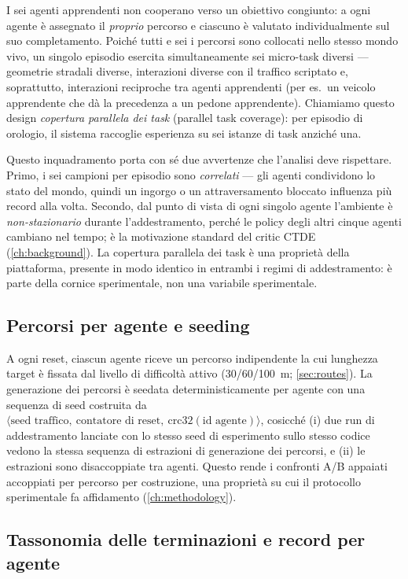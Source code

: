 I sei agenti apprendenti non cooperano verso un obiettivo congiunto: a
ogni agente è assegnato il \emph{proprio} percorso e ciascuno è valutato
individualmente sul suo completamento. Poiché tutti e sei i percorsi
sono collocati nello stesso mondo vivo, un singolo episodio esercita
simultaneamente sei micro-task diversi --- geometrie stradali diverse,
interazioni diverse con il traffico scriptato e, soprattutto,
interazioni reciproche tra agenti apprendenti (per es.\ un veicolo
apprendente che dà la precedenza a un pedone apprendente). Chiamiamo
questo design \emph{copertura parallela dei task} (parallel task
coverage): per episodio di orologio, il sistema raccoglie esperienza su
sei istanze di task anziché una.

Questo inquadramento porta con sé due avvertenze che l'analisi deve
rispettare. Primo, i sei campioni per episodio sono \emph{correlati} ---
gli agenti condividono lo stato del mondo, quindi un ingorgo o un
attraversamento bloccato influenza più record alla volta. Secondo, dal
punto di vista di ogni singolo agente l'ambiente è
\emph{non-stazionario} durante l'addestramento, perché le policy degli
altri cinque agenti cambiano nel tempo; è la motivazione standard del
critic CTDE (\cref{ch:background}). La copertura parallela dei task è
una proprietà della piattaforma, presente in modo identico in entrambi i
regimi di addestramento: è parte della cornice sperimentale, non una
variabile sperimentale.

\subsection{Percorsi per agente e seeding}
\label{sec:seeding}

A ogni reset, ciascun agente riceve un percorso indipendente la cui
lunghezza target è fissata dal livello di difficoltà attivo
(30/60/\SI{100}{m}; \cref{sec:routes}). La generazione dei percorsi è
seedata deterministicamente per agente con una sequenza di seed
costruita da
$\langle\text{seed traffico},\ \text{contatore di reset},\ \mathrm{crc32}(\text{id
agente})\rangle$, cosicché (i) due run di addestramento lanciate con lo
stesso seed di esperimento sullo stesso codice vedono la stessa sequenza
di estrazioni di generazione dei percorsi, e (ii) le estrazioni sono
disaccoppiate tra agenti. Questo rende i confronti A/B appaiati
accoppiati per percorso per costruzione, una proprietà su cui il
protocollo sperimentale fa affidamento (\cref{ch:methodology}).

\subsection{Tassonomia delle terminazioni e record per agente}
\label{sec:termination}

